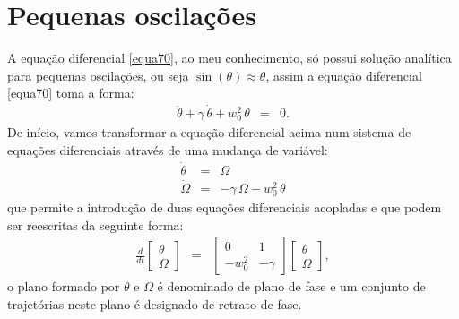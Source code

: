 \documentclass[12pt,openright,twoside,english,brazil]{abntex2}
\begin{document}
\section{Pequenas oscilações}
A equação diferencial \ref{equa70}, ao meu conhecimento, só possui solução analítica para pequenas oscilações, ou seja $\sin{(\theta)} \approx \theta$, assim a equação diferencial \ref{equa70} toma a forma:
\begin{eqnarray}
 \ddot{\theta} + \gamma \, \dot{\theta} + w_0^2 \, \theta & = & 0.
 \label{equa71}   
\end{eqnarray}
De início, vamos transformar a equação diferencial acima num sistema de equações diferenciais através de uma mudança de variável:
\begin{eqnarray}
 \dot{\theta} & = & \Omega \nonumber \\
 \dot{\Omega} & = & - \gamma \, \Omega - w_0^2 \, \theta
 \label{equa72}
 \end{eqnarray}
que permite a introdução de duas equações diferenciais acopladas e que podem ser reescritas da seguinte forma:
\begin{eqnarray}
 \frac{d}{dt} \begin{bmatrix}
                \theta \\
                \Omega
                \end{bmatrix} & = & \begin{bmatrix}
                                      0 & 1 \\
                                      -w_0^2 & -\gamma
                                    \end{bmatrix}
                                    \begin{bmatrix}
                                      \theta \\
                                      \Omega                  
                                    \end{bmatrix},
 \label{equa73}
\end{eqnarray}
o plano formado por $\theta$ e $\Omega$ é denominado de plano de fase e um conjunto de trajetórias neste plano é designado de retrato de fase.
\end{document}

